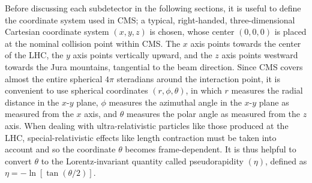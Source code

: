 Before discussing each subdetector in the following sections, it is useful to define the coordinate system used in CMS;
a typical, right-handed, three-dimensional Cartesian coordinate system $(x, y, z)$ is chosen, whose center $(0, 0, 0)$ is placed at the nominal \pp collision point within CMS.
The $x$ axis points towards the center of the LHC, the $y$ axis points vertically upward, and the $z$ axis points westward towards the Jura mountains, tangential to the beam direction.
Since CMS covers almost the entire spherical $4\pi$ steradians around the interaction point, it is convenient to use spherical coordinates $(r, \phi, \theta)$,
in which $r$ measures the radial distance in the $x$-$y$ plane, $\phi$ measures the azimuthal angle in the $x$-$y$ plane as measured from the $x$ axis, and $\theta$ measures the polar angle as measured from the $z$ axis.
When dealing with ultra-relativistic particles like those produced at the LHC, special-relativistic effects like length contraction must be taken into account and so the coordinate $\theta$ becomes frame-dependent.
It is thus helpful to convert $\theta$ to the Lorentz-invariant quantity called pseudorapidity $(\eta)$,
defined as $\eta = -\ln [ \tan(\theta/2)]$. %

